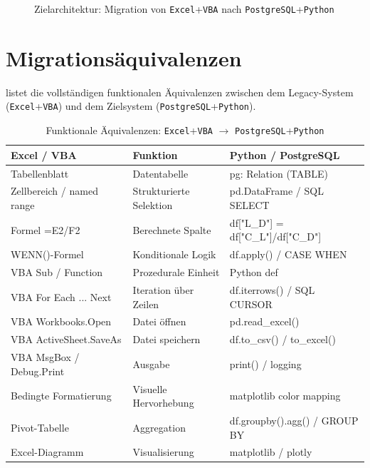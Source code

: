 ﻿\documentclass[12pt,a4paper]{report}
\theoremstyle{definition}
\theoremstyle{remark}
\newcommand{\excel}{\texttt{Excel}}
\newcommand{\vba}{\texttt{VBA}}
\newcommand{\pg}{\texttt{PostgreSQL}}
\newcommand{\py}{\texttt{Python}}
\begin{document}
\begin{figure}[H]
\caption{Zielarchitektur: Migration von \excel{}+\vba{} nach \pg{}+\py{}}
\label{fig:arch}
\end{figure}

\section{Migrationsäquivalenzen}

 listet die vollständigen funktionalen \"Aquivalenzen zwischen
dem Legacy-System (\excel{}+\vba) und dem Zielsystem (\pg{}+\py).

\begin{table}[H]
\centering
\caption{Funktionale \"Aquivalenzen: \excel{}+\vba{} $\to$ \pg{}+\py}
\label{tab:equiv}
\renewcommand{\arraystretch}{1.3}
\begin{tabularx}{\linewidth}{>{\ttfamily\footnotesize}l >{\footnotesize}X >{\ttfamily\footnotesize}X}
\toprule
\textbf{Excel / VBA}         & \textbf{Funktion}                  & \textbf{Python / PostgreSQL} \\
\midrule
Tabellenblatt                & Datentabelle                       & pg: Relation (TABLE) \\
Zellbereich / named range    & Strukturierte Selektion            & pd.DataFrame / SQL SELECT \\
Formel =E2/F2                & Berechnete Spalte                  & df["L\_D"] = df["C\_L"]/df["C\_D"] \\
WENN()-Formel                & Konditionale Logik                 & df.apply() / CASE WHEN \\
VBA Sub / Function           & Prozedurale Einheit                & Python def \\
VBA For Each ... Next        & Iteration über Zeilen              & df.iterrows() / SQL CURSOR \\
VBA Workbooks.Open           & Datei \"offnen                       & pd.read\_excel() \\
VBA ActiveSheet.SaveAs       & Datei speichern                    & df.to\_csv() / to\_excel() \\
VBA MsgBox / Debug.Print     & Ausgabe                            & print() / logging \\
Bedingte Formatierung        & Visuelle Hervorhebung              & matplotlib color mapping \\
Pivot-Tabelle                & Aggregation                        & df.groupby().agg() / GROUP BY \\
Excel-Diagramm               & Visualisierung                     & matplotlib / plotly \\
\bottomrule
\end{tabularx}
\end{table}
\end{document}
